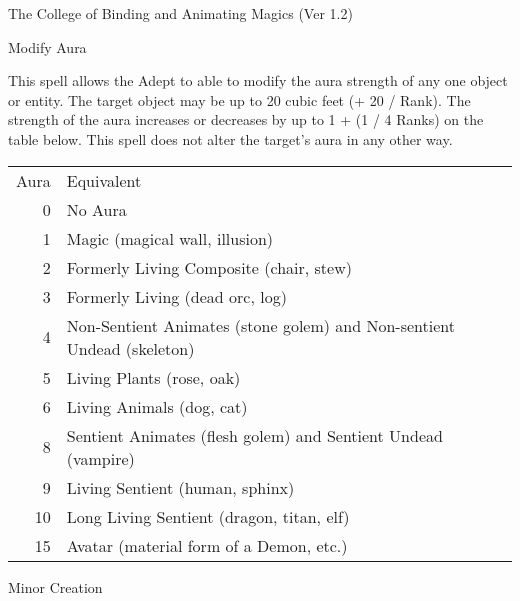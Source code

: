 \begin{Chapter}{The College of Binding and Animating Magics (Ver 1.2)}
\begin{spell}[G-6]{Modify Aura}

\begin{effects}
This spell allows the Adept to able to modify the aura strength of any
one object or entity. The target object may be up to 20 cubic feet (+
20 / Rank).  The strength of the aura increases or decreases by up to
1 + (1 / 4 Ranks) on the table below. This spell does not alter the
target’s aura in any other way.

\begin{tabularx}{\columnwidth}{rX}
Aura	& Equivalent \\
0	& No Aura \\
1	& Magic (magical wall, illusion) \\
2	& Formerly Living Composite (chair, stew) \\
3	& Formerly Living (dead orc, log) \\
4	& Non-Sentient Animates (stone golem) and Non-sentient Undead (skeleton) \\
5	& Living Plants (rose, oak) \\
6	& Living Animals (dog, cat) \\
8	& Sentient Animates (flesh golem) and Sentient Undead (vampire) \\
9	& Living Sentient (human, sphinx) \\
10	& Long Living Sentient (dragon, titan, elf) \\
15	& Avatar (material form of a Demon, etc.) \\
\end{tabularx}
\end{effects}
\end{spell}

\begin{spell}[G-7]{Minor Creation}


\end{spell}
\end{Chapter}

